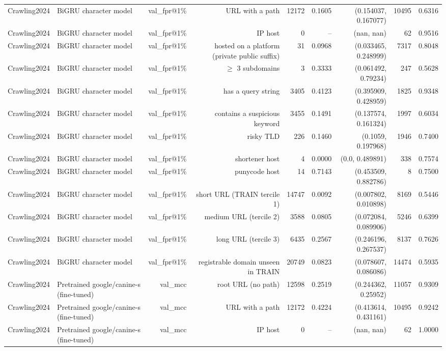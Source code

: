 \begin{table}[t]
\begin{tabular}{llrrrrrrr}
Crawling2024 & BiGRU character model & val\_fpr@1\% & URL with a path & 12172 & 0.1605 & (0.154037, 0.167077) & 10495 & 0.6316 \\
Crawling2024 & BiGRU character model & val\_fpr@1\% & IP host & 0 & -- & (nan, nan) & 62 & 0.9516 \\
Crawling2024 & BiGRU character model & val\_fpr@1\% & hosted on a platform (private public suffix) & 31 & 0.0968 & (0.033465, 0.248999) & 7317 & 0.8048 \\
Crawling2024 & BiGRU character model & val\_fpr@1\% & $\geq$ 3 subdomains & 3 & 0.3333 & (0.061492, 0.79234) & 247 & 0.5628 \\
Crawling2024 & BiGRU character model & val\_fpr@1\% & has a query string & 3405 & 0.4123 & (0.395909, 0.428959) & 1825 & 0.9348 \\
Crawling2024 & BiGRU character model & val\_fpr@1\% & contains a suspicious keyword & 3455 & 0.1491 & (0.137574, 0.161324) & 1997 & 0.6034 \\
Crawling2024 & BiGRU character model & val\_fpr@1\% & risky TLD & 226 & 0.1460 & (0.1059, 0.197968) & 1946 & 0.7400 \\
Crawling2024 & BiGRU character model & val\_fpr@1\% & shortener host & 4 & 0.0000 & (0.0, 0.489891) & 338 & 0.7574 \\
Crawling2024 & BiGRU character model & val\_fpr@1\% & punycode host & 14 & 0.7143 & (0.453509, 0.882786) & 8 & 0.7500 \\
Crawling2024 & BiGRU character model & val\_fpr@1\% & short URL (TRAIN tercile 1) & 14747 & 0.0092 & (0.007802, 0.010898) & 8169 & 0.5446 \\
Crawling2024 & BiGRU character model & val\_fpr@1\% & medium URL (tercile 2) & 3588 & 0.0805 & (0.072084, 0.089906) & 5246 & 0.6399 \\
Crawling2024 & BiGRU character model & val\_fpr@1\% & long URL (tercile 3) & 6435 & 0.2567 & (0.246196, 0.267537) & 8137 & 0.7626 \\
Crawling2024 & BiGRU character model & val\_fpr@1\% & registrable domain unseen in TRAIN & 20749 & 0.0823 & (0.078607, 0.086086) & 14474 & 0.5935 \\
Crawling2024 & Pretrained google/canine-s (fine-tuned) & val\_mcc & root URL (no path) & 12598 & 0.2519 & (0.244362, 0.25952) & 11057 & 0.9309 \\
Crawling2024 & Pretrained google/canine-s (fine-tuned) & val\_mcc & URL with a path & 12172 & 0.4224 & (0.413614, 0.431161) & 10495 & 0.9242 \\
Crawling2024 & Pretrained google/canine-s (fine-tuned) & val\_mcc & IP host & 0 & -- & (nan, nan) & 62 & 1.0000 \\

\end{tabular}
\end{table}
